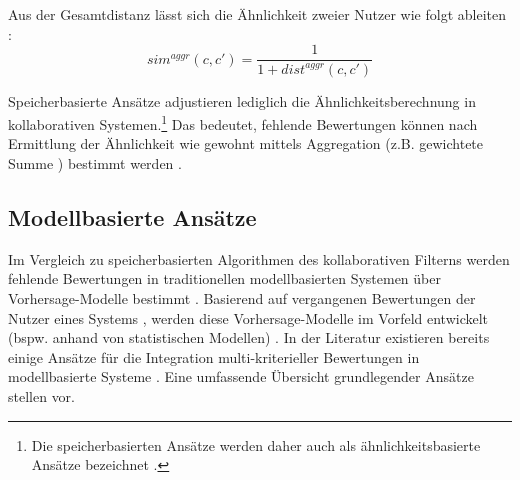 Aus der Gesamtdistanz lässt sich die Ähnlichkeit zweier Nutzer wie folgt ableiten \cite[S. 858]{adomavicius:4:inbook}:
\begin{equation}\label{eq21}
    sim^{aggr}(c,c') = \frac{1}{1 + dist^{aggr}(c,c')}
\end{equation}

Speicherbasierte Ansätze adjustieren lediglich die Ähnlichkeitsberechnung in kollaborativen Systemen.\footnote{Die speicherbasierten Ansätze werden daher auch als ähnlichkeitsbasierte Ansätze bezeichnet \cite[S. 52]{adomavicius:inproceedings:2}.}
Das bedeutet, fehlende Bewertungen können nach Ermittlung der Ähnlichkeit wie gewohnt mittels Aggregation (z.B. gewichtete Summe \cite[S. 859]{adomavicius:4:inbook}) bestimmt werden \cite[S. 52]{adomavicius:inproceedings:2}\cite[S. 428]{recommenderSystems:2016}.

\subsection{Modellbasierte Ansätze}
\label{ch:erweiterungen:loesungen:modellbasiert}
Im Vergleich zu speicherbasierten Algorithmen des kollaborativen Filterns werden fehlende Bewertungen in traditionellen modellbasierten Systemen über Vorhersage-Modelle bestimmt \cite[S. 861]{recommenderSystems:2016}.
Basierend auf vergangenen Bewertungen der Nutzer eines Systems \cite[S. 358]{jin:article}, werden diese Vorhersage-Modelle im Vorfeld entwickelt (bspw. anhand von statistischen Modellen) \cite[S. 71]{recommenderSystems:2016}.
In der Literatur existieren bereits einige Ansätze für die Integration multi-kriterieller Bewertungen in modellbasierte Systeme \cite[S. 861]{adomavicius:4:inbook}.
Eine umfassende Übersicht grundlegender Ansätze stellen \textcite[S. 861]{adomavicius:4:inbook} vor.

